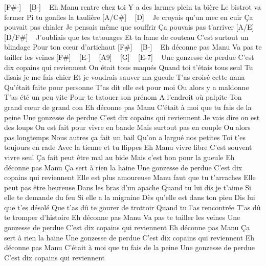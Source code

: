 

[F#-] ~ [B-] ~
Eh Manu rentre chez toi
Y a des larmes plein ta bière
Le bistrot va fermer
Pi tu gonfles la taulière
[A/C#] ~ [D] ~
Je croyais qu'un mec en cuir
Ça pouvait pas chialer
Je pensais même que souffrir
Ça pouvais pas t'arriver
[A/E] ~ [D/F#] ~
J'oubliais que tes tatouages
Et ta lame de couteau
C'est surtout un blindage
Pour ton cœur d'artichaut
[F#] ~ [B-] ~
Eh déconne pas Manu
Va pas te tailler les veines
[F#] ~ [E-] ~ [A9] ~ [G] ~ [E-7] ~
Une gonzesse de perdue
C'est dix copains qui reviennent
On était tous maqués
Quand toi t'étais tous seul
Tu disais je me fais chier
Et je voudrais sauver ma gueule
T'as croisé cette nana
Qu'était faite pour personne
T'as dit elle est pour moi
Ou alors y a maldonne
T'as été un peu vite
Pour te tatouer son prénom
A l'endroit où palpite
Ton grand cœur de grand con
Eh déconne pas Manu
C'était à moi que tu fais de la peine
Une gonzesse de perdue
C'est dix copains qui reviennent
Je vais dire on est des loups
On est fait pour vivre en bande
Mais surtout pas en couple
Ou alors pas longtemps
Nous autres ça fait un bail
Qu'on a largué nos petites
Toi t'es toujours en rade
Avec la tienne et tu flippes
Eh Manu vivre libre
C'est souvent vivre seul
Ça fait peut être mal au bide
Mais c'est bon pour la gueule
Eh déconne pas Manu
Ça sert à rien la haine
Une gonzesse de perdue
C'est dix copains qui reviennent
Elle est plus amoureuse
Manu faut que tu t'arraches
Elle peut pas être heureuse
Dans les bras d'un apache
Quand tu lui dis je t'aime
Si elle te demande du feu
Si elle a la migraine
Dès qu'elle est dans ton pieu
Dis lui que t'es désolé
Que t'as dû te gourer de trottoir
Quand tu l'as rencontrée
T'as dû te tromper d'histoire
Eh déconne pas Manu
Va pas te tailler les veines
Une gonzesse de perdue
C'est dix copains qui reviennent
Eh déconne pas Manu
Ça sert à rien la haine
Une gonzesse de perdue
C'est dix copains qui reviennent
Eh déconne pas Manu
C'était à moi que tu fais de la peine
Une gonzesse de perdue
C'est dix copains qui reviennent